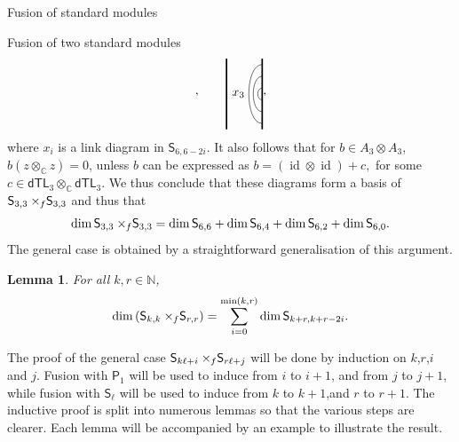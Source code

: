 \documentclass[reqno]{amsart}
\newtheorem{Lem}[Thm]{Lemma}
\newcommand{\dtl}[1]{\mathsf{dTL}_{#1}}
\newcommand{\ds}[1]{\mathsf S_{#1}}
\newcommand{\dP}[1]{\mathsf P_{#1}}
\newcommand{\xf}{\times\hspace{-0.27em}_f}
\newcommand{\lc}{\ell}
\DeclareMathOperator{\id}{id}
\begin{document}
\begin{section}{Fusion of standard modules}
\begin{subsection}{Fusion of two standard modules}
\begin{equation}
\begin{tikzpicture}[baseline={(current bounding box.center)},scale = 1/3]
\end{tikzpicture}, \qquad
\begin{tikzpicture}[baseline={(current bounding box.center)},scale = 1/3]
%
	\draw[very thick] (0,-3) -- (0,3);
	\draw[very thick] (3,-3) -- (3,3);
	\draw (3,-5/2) .. controls (3/2,-5/2) and (3/2,5/2) .. (3,5/2);
	\draw (3,-3/2) .. controls (2,-3/2) and (2,3/2) ..  (3,3/2);
	\draw (3,-1/2) .. controls (5/2,-1/2) and (5/2,1/2) .. (3,1/2);
%
	\node at (1,0) {$x_3$};
\end{tikzpicture},
\end{equation}
where $x_{i}$ is a link diagram in $\ds{6,6-2i}$. It also follows that for $b \in A_{3} \otimes A_{3}$, $ b ( z \otimes_{\mathbb{C}} z) = 0$, unless $b$ can be expressed as $b = (\id\otimes \id) + c,$ for some $c\in\dtl{3}\otimes_{\mathbb{C}}\dtl{3}$. We thus conclude that these diagrams form a basis of $\ds{3,3}\xf \ds{3,3}$ and thus that $$\dim \ds{3,3}\xf\ds{3,3} = \dim \ds{6,6} + \dim \ds{6,4} + \dim \ds{6,2} + \dim \ds{6,0}.$$
The general case is obtained by a straightforward generalisation of this argument.
\begin{Lem}\label{lem:magickdim}
For all $k,r \in \mathbb{N}$,
\begin{equation}
\dim \left( \ds{k,k} \xf \ds{r,r} \right) = \sum_{i=0}^{\min\left(k,r \right)} \dim \ds{k+r, k+r-2i}.
\end{equation}
\end{Lem}

The proof of the general case $\ds{k \lc +i} \xf \ds{r \lc +j}$ will be done by induction on $k$,$r$,$i$ and $j$. Fusion with $\dP{1}$ will be used to induce from $i$ to $i+1$, and from $j$ to $j+1$, while fusion with $\ds{\lc}$ will be used to induce from $k$ to $k+1$,and $r$ to $r+1$. The inductive proof is split into numerous lemmas so that the various steps are clearer. Each lemma will be accompanied by an example to illustrate the result.


\end{subsection}
\end{section}
\end{document}
